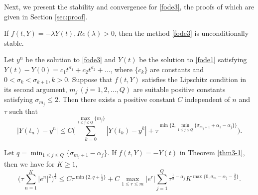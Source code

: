 \documentclass[10pt]{siamltex}
\begin{document}
Next, we present the stability and convergence for \eqref{fode3}, the proofs of which are given
in Section \ref{sec:proof}.
\begin{theorem}\label{thm3-2}
If $f(t,Y)=-\lambda Y(t),Re(\lambda)>0$, then the method \eqref{fode3} is unconditionally stable.
\end{theorem}
\begin{theorem}[Convergence]\label{thm3-1}
Let $y^n$ be the solution to \eqref{fode3} and $Y(t)$ be the solution to \eqref{fode1} satisfying
$Y(t)-Y(0)=c_1t^{\sigma_1}+c_2t^{\sigma_2}+...$,
where $\{c_k\}$ are constants and $0<\sigma_k<\sigma_{k+1},k>0$. Suppose that $f(t,Y)$ satisfies
the Lipschitz condition in its second  argument,
$m_j\,(j=1,2,...,Q)$ are suitable positive constants satisfying $\sigma_{m_j}\leq 2$.
Then there exists a positive constant $C$ independent of $n$ and $\tau$ such that
\begin{equation}\label{fode6}
|Y(t_n)-y^n|\leq C \bigg(\sum_{k=0}^{\max\limits_{1\leq j \leq Q}\{m_{j}\}}|Y(t_k)-y^k|
+\tau^{\min\big\{2,\min\limits_{1\leq j \leq Q}\{\sigma_{m_j+1}+\alpha_1-\alpha_j\}\big\}}\bigg).
\end{equation}
\end{theorem}




\begin{theorem}\label{theorem3-3} Let $q=\min_{1\leq j \leq Q}\{\sigma_{m_j+1}-\alpha_j\}$.
If $f(t,Y)=-Y(t)$ in Theorem \ref{thm3-1}, then  we have for $K\geq1$,
\begin{equation}\label{fode6-2}
\bigg(\tau\sum_{n=1}^K|e^n|^2\bigg)^{\frac{1}{2}}
\leq C\tau^{\min\{2,q+ \frac{1}{2}\}}
+C\max_{1\leq r \leq m}|e^r|
\sum_{j=1}^Q\tau^{\frac{1}{2}-\alpha_j}K^{\max\{0,\sigma_m-\alpha_j-\frac{3}{2}\}}.
\end{equation}
\end{theorem}
\end{document}
